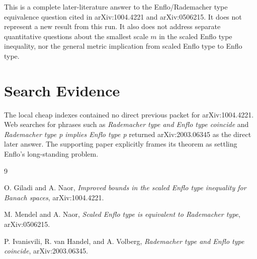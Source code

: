 \documentclass[11pt]{article}
\begin{document}
This is a complete later-literature answer to the Enflo/Rademacher type
equivalence question cited in arXiv:1004.4221 and arXiv:0506215. It does not
represent a new result from this run. It also does not address separate
quantitative questions about the smallest scale $m$ in the scaled Enflo type
inequality, nor the general metric implication from scaled Enflo type to Enflo
type.

\section*{Search Evidence}

The local cheap indexes contained no direct previous packet for arXiv:1004.4221.
Web searches for phrases such as \emph{Rademacher type and Enflo type coincide}
and \emph{Rademacher type p implies Enflo type p} returned arXiv:2003.06345 as
the direct later answer. The supporting paper explicitly frames its theorem as
settling Enflo's long-standing problem.

\begin{thebibliography}{9}

O. Giladi and A. Naor,
\emph{Improved bounds in the scaled Enflo type inequality for Banach spaces},
arXiv:1004.4221.

M. Mendel and A. Naor,
\emph{Scaled Enflo type is equivalent to Rademacher type},
arXiv:0506215.

P. Ivanisvili, R. van Handel, and A. Volberg,
\emph{Rademacher type and Enflo type coincide},
arXiv:2003.06345.

\end{thebibliography}
\end{document}
